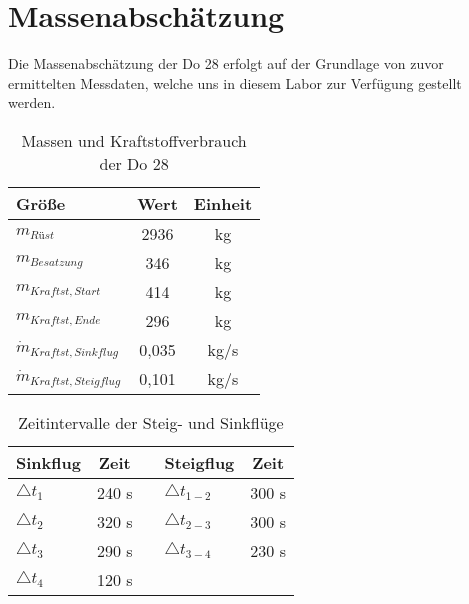\chapter{Massenabschätzung}
\label{chapter:masse}
Die Massenabschätzung der Do 28 erfolgt auf der Grundlage von zuvor ermittelten Messdaten, welche uns in diesem Labor zur Verfügung gestellt werden. \\

\begin{table}[h]
	\centering
	\begin{tabular}{|l|c|c|}
		\hline
	\textbf{Größe}		 & \textbf{Wert}& \textbf{Einheit} \\ \hline
	$m_{Rüst}$  		 & 2936			& {kg}        \\ \hline
	$m_{Besatzung}$ 	 & 346			& {kg}		  \\ \hline
	$m_{Kraftst,Start}$	 & 414			& {kg}		  \\ \hline
	$m_{Kraftst,Ende}$	 & 296			& {kg}		  \\ \hline
	$\dot{m}_{Kraftst,Sinkflug}$    & 0,035			& {kg/s}		  \\ \hline
	$\dot{m}_{Kraftst,Steigflug}$ 	 & 0,101			& {kg/s}	  \\ \hline
		


\end{tabular}
	\caption{Massen und Kraftstoffverbrauch der Do 28}
\end{table}


\begin{table}[h]
	\centering
	\begin{tabular}{|l|c|c|l|c|}
		\hline
		\textbf{Sinkflug}		 & \textbf{Zeit}& \textbf{} & \textbf{Steigflug} & \textbf{Zeit} \\ \hline
		$\triangle t_1$  & 240 {s} & & $\triangle t_{1-2}$ & 300 s         \\ \hline
		$\triangle t_2$  & 320 {s} & & $\triangle t_{2-3}$ & 300 s		  \\ \hline
		$\triangle t_3$	 & 290 {s} & & $\triangle t_{3-4}$ & 230 s	  \\ \hline
		$\triangle t_4$	 & 120 {s} & &	&	  \\ \hline
	
	  \hline
		
		
		
	\end{tabular}
	\caption{Zeitintervalle der Steig- und Sinkflüge}
\end{table} 
\vspace{0.3cm} 

